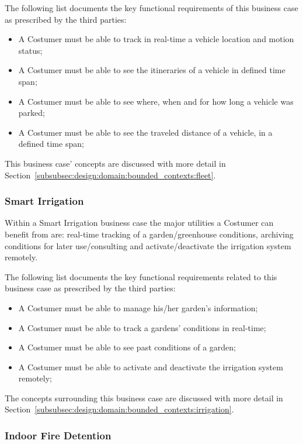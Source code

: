 The following list documents the key functional requirements of this business case as prescribed by the third parties:

\begin{itemize}
    \item A Costumer must be able to track in real-time a vehicle location and motion status;
    \item A Costumer must be able to see the itineraries of a vehicle in defined time span;
    \item A Costumer must be able to see where, when and for how long a vehicle was parked;
    \item A Costumer must be able to see the traveled distance of a vehicle, in a defined time span;
\end{itemize}

This business case' concepts are discussed with more detail in Section~\ref{subsubsec:design:domain:bounded_contexts:fleet}.

\subsubsection{Smart Irrigation}
\label{subsubsec:requirements:functional:services:irrigation}

Within a Smart Irrigation business case the major utilities a Costumer can benefit from are: real-time tracking of a garden/greenhouse conditions, archiving conditions for later use/consulting and activate/deactivate the irrigation system remotely.

The following list documents the key functional requirements related to this business case as prescribed by the third parties:

\begin{itemize}
    \item A Costumer must be able to manage his/her garden's information;
    \item A Costumer must be able to track a gardens' conditions in real-time;
    \item A Costumer must be able to see past conditions of a garden;
    \item A Costumer must be able to activate and deactivate the irrigation system remotely;
\end{itemize}

The concepts surrounding this business case are discussed with more detail in Section~\ref{subsubsec:design:domain:bounded_contexts:irrigation}.

\subsubsection{Indoor Fire Detention}
\label{subsubsec:requirements:functional:services:fire}

